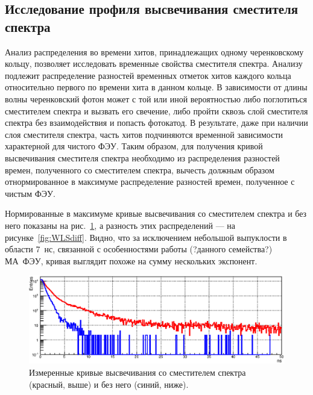 \subsection{Исследование профиля высвечивания сместителя спектра}\label{section:secWLS}

Анализ распределения во времени хитов, принадлежащих одному черенковскому кольцу, позволяет исследовать временные свойства сместителя спектра. Анализу подлежит распределение разностей временных отметок хитов каждого кольца относительно первого по времени хита в данном кольце. В зависимости от длины волны черенковский фотон может с той или иной вероятностью либо поглотиться сместителем спектра и вызвать его свечение, либо пройти сквозь слой сместителя спектра без взаимодействия и попасть фотокатод. В результате, даже при наличии слоя сместителя спектра, часть хитов подчиняются временной зависимости характерной для чистого ФЭУ.
Таким образом, для получения кривой высвечивания сместителя спектра необходимо из распределения разностей времен, полученного со сместителем спектра, вычесть должным образом отнормированное в максимуме распределение разностей времен, полученное с чистым ФЭУ.

Нормированные в максимуме кривые высвечивания со сместителем спектра и без него показаны на рис.~\ref{fig:WLStwoCurves}, а разность этих распределений --- на рисунке~\ref{fig:WLSdiff}. Видно, что за исключением небольшой выпуклости в области 7~нс, связанной с особенностями работы (?данного семейства?) МА~ФЭУ, кривая выглядит похоже на сумму нескольких экспонент.

\begin{figure}
\includegraphics[width=1.0\textwidth]{pictures/WLS.eps}
\caption{Измеренные кривые высвечивания со сместителем спектра (красный, выше) и без него (синий, ниже).}
\label{fig:WLStwoCurves}
\end{figure}

